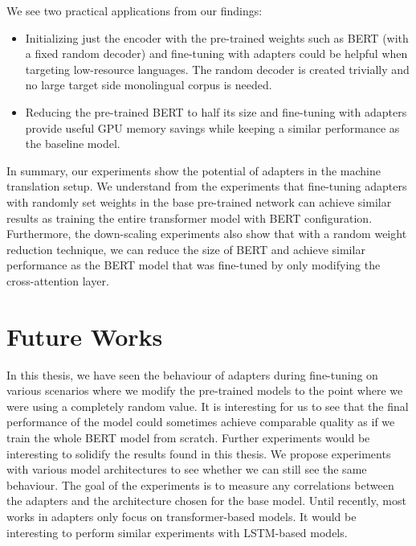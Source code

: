 We see two practical applications from our findings:
\begin{itemize}
    \item Initializing just the encoder with the pre-trained weights such as BERT (with a fixed random decoder) and fine-tuning with adapters could be helpful when targeting low-resource languages. The random decoder is created trivially and no large target side monolingual corpus is needed.
    \item Reducing the pre-trained BERT to half its size and fine-tuning with adapt\-ers provide useful GPU memory savings while keeping a similar performance as the baseline model.
\end{itemize}

In summary, our experiments show the potential of adapters in the machine translation setup. We understand from the experiments that fine-tuning adapters with randomly set weights in the base pre-trained network can achieve similar results as training the entire transformer model with BERT configuration. Furthermore, the down-scaling experiments also show that with a random weight reduction technique, we can reduce the size of BERT and achieve similar performance as the BERT model that was fine-tuned by only modifying the cross-attention layer.

\section{Future Works}
In this thesis, we have seen the behaviour of adapters during fine-tuning on various scenarios where we modify the pre-trained models to the point where we were using a completely random value. It is interesting for us to see that the final performance of the model could sometimes achieve comparable quality as if we train the whole BERT model from scratch. Further experiments would be interesting to solidify the results found in this thesis. We propose experiments with various model architectures to see whether we can still see the same behaviour. The goal of the experiments is to measure any correlations between the adapters and the architecture chosen for the base model. Until recently, most works in adapters only focus on transformer-based models. It would be interesting to perform similar experiments with LSTM-based models.

